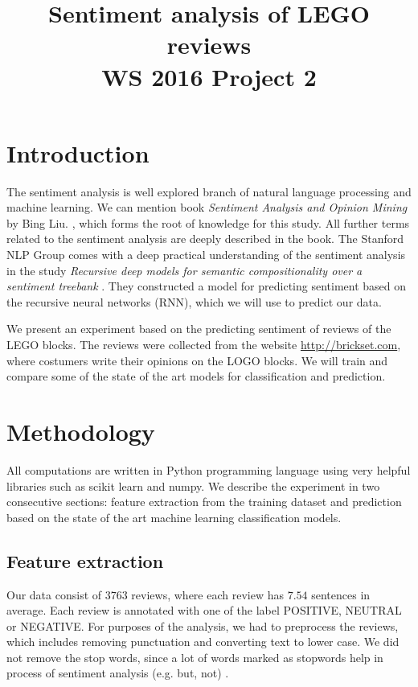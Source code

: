 \documentclass{sig-alternate}
\begin{document}
\title{Sentiment analysis of LEGO reviews\\WS 2016 Project 2}
\maketitle



\section{Introduction}
The sentiment analysis is well explored branch of natural language processing and machine learning.
We can mention book {\it Sentiment  Analysis  and  Opinion  Mining} by Bing  Liu. \cite{reading}, which forms the root of knowledge for this study.
All further terms related to the sentiment analysis are deeply described in the book.
The Stanford NLP Group \cite{stanfnlp} comes with a deep practical understanding of the sentiment analysis in the study {\it Recursive deep models for semantic compositionality over a sentiment treebank} \cite{stanford}.
They constructed a model for predicting sentiment based on the recursive neural networks (RNN), which we will use to predict our data.

We present an experiment based on the predicting sentiment of reviews of the LEGO blocks.
The reviews were collected from the website \url{http://brickset.com}, where costumers write their opinions on the LOGO blocks.
We will train and compare some of the state of the art models for classification and prediction.

\section{Methodology}
All computations are written in Python programming language using very helpful libraries such as scikit learn\cite{scikit} and numpy\cite{numpy}.
We describe the experiment in two consecutive sections: feature extraction from the training dataset and prediction based on the state of the art machine learning classification models.

\subsection{Feature extraction}
Our data consist of $3763$ reviews, where each review has $7.54$ sentences in average.
Each review is annotated with one of the label POSITIVE, NEUTRAL or NEGATIVE.
For purposes of the analysis, we had to preprocess the reviews, which includes removing punctuation and converting text to lower case.
We did not remove the stop words, since a lot of words marked as stopwords help in process of sentiment analysis (e.g. but, not) \cite{reading}.
\end{document}
